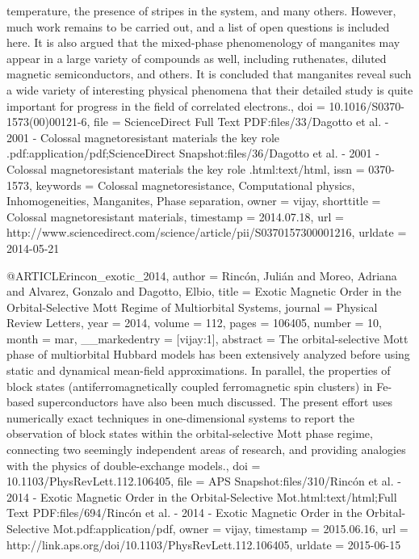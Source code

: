 {{	temperature, the presence of stripes in the system, and many others.
	However, much work remains to be carried out, and a list of open
	questions is included here. It is also argued that the mixed-phase
	phenomenology of manganites may appear in a large variety of compounds
	as well, including ruthenates, diluted magnetic semiconductors, and
	others. It is concluded that manganites reveal such a wide variety
	of interesting physical phenomena that their detailed study is quite
	important for progress in the field of correlated electrons.},
  doi = {10.1016/S0370-1573(00)00121-6},
  file = {ScienceDirect Full Text PDF:files/33/Dagotto et al. - 2001 - Colossal magnetoresistant materials the key role .pdf:application/pdf;ScienceDirect Snapshot:files/36/Dagotto et al. - 2001 - Colossal magnetoresistant materials the key role .html:text/html},
  issn = {0370-1573},
  keywords = {Colossal magnetoresistance, Computational physics, Inhomogeneities,
	Manganites, Phase separation},
  owner = {vijay},
  shorttitle = {Colossal magnetoresistant materials},
  timestamp = {2014.07.18},
  url = {http://www.sciencedirect.com/science/article/pii/S0370157300001216},
  urldate = {2014-05-21}
}

@ARTICLE{rincon_exotic_2014,
  author = {Rincón, Julián and Moreo, Adriana and Alvarez, Gonzalo and Dagotto,
	Elbio},
  title = {Exotic {Magnetic} {Order} in the {Orbital}-{Selective} {Mott} {Regime}
	of {Multiorbital} {Systems}},
  journal = {Physical Review Letters},
  year = {2014},
  volume = {112},
  pages = {106405},
  number = {10},
  month = mar,
  __markedentry = {[vijay:1]},
  abstract = {The orbital-selective Mott phase of multiorbital Hubbard models has
	been extensively analyzed before using static and dynamical mean-field
	approximations. In parallel, the properties of block states (antiferromagnetically
	coupled ferromagnetic spin clusters) in Fe-based superconductors
	have also been much discussed. The present effort uses numerically
	exact techniques in one-dimensional systems to report the observation
	of block states within the orbital-selective Mott phase regime, connecting
	two seemingly independent areas of research, and providing analogies
	with the physics of double-exchange models.},
  doi = {10.1103/PhysRevLett.112.106405},
  file = {APS Snapshot:files/310/Rincón et al. - 2014 - Exotic Magnetic Order in the Orbital-Selective Mot.html:text/html;Full Text PDF:files/694/Rincón et al. - 2014 - Exotic Magnetic Order in the Orbital-Selective Mot.pdf:application/pdf},
  owner = {vijay},
  timestamp = {2015.06.16},
  url = {http://link.aps.org/doi/10.1103/PhysRevLett.112.106405},
  urldate = {2015-06-15}
}

